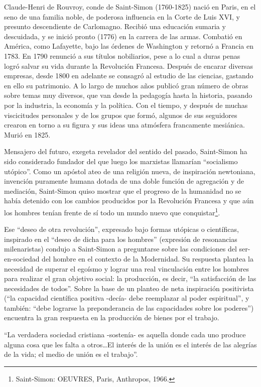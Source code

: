 \documentclass[
]{book}
\begin{document}
Claude-Henri de Rouvroy, conde de Saint-Simon (1760-1825) nació en Paris, en el seno de una familia noble, de poderosa influencia en la Corte de Luis XVI, y presunto descendiente de Carlomagno. Recibió una educación sumaria y descuidada, y se inició pronto (1776) en la carrera de las armas. Combatió en América, como Lafayette, bajo las órdenes de Washington y retornó a Francia en 1783. En 1790 renunció a sus títulos nobiliarios, pese a lo cual a duras penas logró salvar su vida durante la Revolución Francesa. Después de encarar diversas empresas, desde 1800 en adelante se consagró al estudio de las ciencias, gastando en ello su patrimonio. A lo largo de muchos años publicó gran número de obras sobre temas muy diversos, que van desde la pedagogía hasta la historia, pasando por la industria, la economía y la política. Con el tiempo, y después de muchas viscicitudes personales y de los grupos que formó, algunos de sus seguidores crearon en torno a su figura y sus ideas una atmósfera francamente mesiánica. Murió en 1825.

Mensajero del futuro, exegeta revelador del sentido del pasado, Saint-Simon ha sido considerado fundador del que luego los marxistas llamarían ``socialismo utópico''. Como un apóstol ateo de una religión nueva, de inspiración newtoniana, invención puramente humana dotada de una doble función de agregación y de mediación, Saint-Simon quiso mostrar que el progreso de la humanidad no se había detenido con los cambios producidos por la Revolución Francesa y que aún los hombres tenían frente de sí todo un mundo nuevo que conquistar\footnote{Saint-Simon: OEUVRES, Paris, Anthropos, 1966.}.

Ese ``deseo de otra revolución'', expresado bajo formas utópicas o científicas, inspirado en el ``deseo de dicha para los hombres'' (expresión de resonancias milenaristas) condujo a Saint-Simon a preguntarse sobre las condiciones del ser-en-sociedad del hombre en el contexto de la Modernidad. Su respuesta plantea la necesidad de superar el egoísmo y lograr una real vinculación entre los hombres para realizar el gran objetivo social: la producción, es decir, ``la satisfacción de las necesidades de todos''. Sobre la base de un planteo de neta inspiración positivista (``la capacidad científica positiva -decía- debe reemplazar al poder espiritual'', y también: ``debe lograrse la preponderancia de las capacidades sobre los poderes'') encuentra la gran respuesta en la producción de bienes por el trabajo.

``La verdadera sociedad cristiana -sostenía- es aquella donde cada uno produce alguna cosa que les falta a otros\ldots El interés de la unión es el interés de las alegrías de la vida; el medio de unión es el trabajo''.
\end{document}
